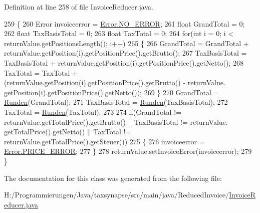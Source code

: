 Definition at line 258 of file Invoice\-Reducer.\-java.


\begin{DoxyCode}
259     \{
260         Error invoiceerror = \hyperlink{enum_reduced_invoice_1_1_a_invoice_1_1_error_ab758351b18ce3163abca9924287fc6df}{Error.NO\_ERROR};
261         \textcolor{keywordtype}{float} GrandTotal = 0;
262         \textcolor{keywordtype}{float} TaxBasisTotal = 0;
263         \textcolor{keywordtype}{float} TaxTotal = 0;
264         \textcolor{keywordflow}{for}(\textcolor{keywordtype}{int} i = 0; i < returnValue.getPositionsLength(); i++)
265         \{
266             GrandTotal = GrandTotal + returnValue.getPosition(i).getPositionPrice().getBrutto();
267             TaxBasisTotal = TaxBasisTotal + returnValue.getPosition(i).getPositionPrice().getNetto();
268             TaxTotal = TaxTotal + (returnValue.getPosition(i).getPositionPrice().getBrutto() - returnValue.
      getPosition(i).getPositionPrice().getNetto());
269         \}
270         GrandTotal = \hyperlink{class_reduced_invoice_1_1_invoice_reducer_a4d9155f5cc7223ed2659a8567f9ba1ec}{Runden}(GrandTotal);
271         TaxBasisTotal = \hyperlink{class_reduced_invoice_1_1_invoice_reducer_a4d9155f5cc7223ed2659a8567f9ba1ec}{Runden}(TaxBasisTotal);
272         TaxTotal = \hyperlink{class_reduced_invoice_1_1_invoice_reducer_a4d9155f5cc7223ed2659a8567f9ba1ec}{Runden}(TaxTotal);
273         
274         \textcolor{keywordflow}{if}(GrandTotal != returnValue.getTotalPrice().getBrutto() || TaxBasisTotal != returnValue.
      getTotalPrice().getNetto() || TaxTotal != returnValue.getTotalPrice().getSteuer())
275         \{
276             invoiceerror = \hyperlink{enum_reduced_invoice_1_1_a_invoice_1_1_error_a5c521b3b1cc9827b5dba56d42a770481}{Error.PRICE\_ERROR};
277         \}
278         returnValue.setInvoiceError(invoiceerror);
279     \}
\end{DoxyCode}


The documentation for this class was generated from the following file\-:\begin{DoxyCompactItemize}
\item 
H\-:/\-Programmierungen/\-Java/taxsynapse/src/main/java/\-Reduced\-Invoice/\hyperlink{_invoice_reducer_8java}{Invoice\-Reducer.\-java}\end{DoxyCompactItemize}

